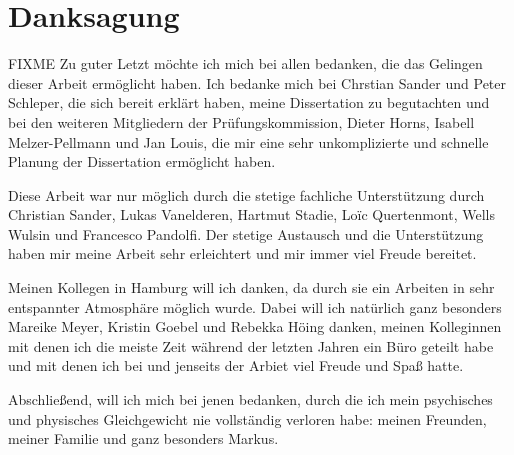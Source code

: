 \chapter*{Danksagung}
\vspace{1cm}
FIXME
Zu guter Letzt möchte ich mich bei allen bedanken, die das Gelingen dieser Arbeit ermöglicht haben.
Ich bedanke mich bei Chrstian Sander und Peter Schleper, die sich bereit erklärt haben, meine Dissertation zu begutachten und bei den  weiteren Mitgliedern der Prüfungskommission, Dieter Horns, Isabell Melzer-Pellmann und Jan Louis, die mir eine sehr unkomplizierte und schnelle Planung der Dissertation ermöglicht haben.

Diese Arbeit war nur möglich durch die stetige fachliche Unterstützung durch Christian Sander, Lukas Vanelderen, Hartmut Stadie, Lo\"{i}c Quertenmont, Wells Wulsin und Francesco Pandolfi.
Der stetige Austausch und die Unterstützung haben mir meine Arbeit sehr erleichtert und mir immer viel Freude bereitet.

Meinen Kollegen in Hamburg will ich danken, da durch sie ein Arbeiten in sehr entspannter Atmosphäre möglich wurde.
Dabei will ich natürlich ganz besonders Mareike Meyer, Kristin Goebel und Rebekka Höing danken, meinen Kolleginnen mit denen ich die meiste Zeit während der letzten Jahren ein Büro geteilt habe und mit denen ich bei und jenseits der Arbiet viel Freude und Spaß hatte.    

Abschließend, will ich mich bei jenen bedanken, durch die ich mein psychisches und physisches Gleichgewicht nie vollständig verloren habe: meinen Freunden, meiner Familie und ganz besonders Markus.  
